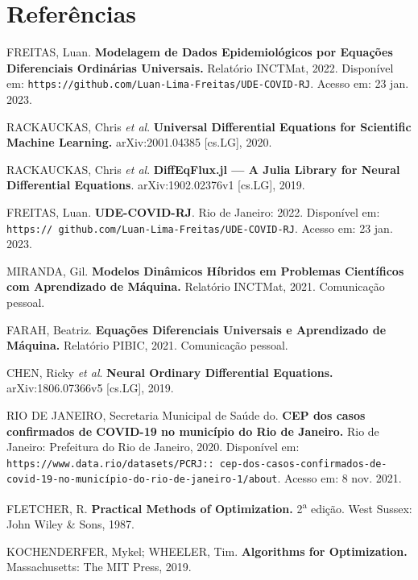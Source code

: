 \documentclass[a4paper,12pt]{article}
\begin{document}
\section{Referências}

\begin{enumerate}[label={[\arabic*]}]
	\item FREITAS, Luan. \textbf{Modelagem de Dados Epidemiológicos por Equações Diferenciais Ordinárias Universais.} Relatório INCTMat, 2022. Disponível em: \texttt{https://github.com/Luan-Lima-Freitas/UDE-COVID-RJ}. Acesso em: 23 jan. 2023.
	\item  RACKAUCKAS, Chris \textit{et al}. \textbf{Universal Differential Equations for Scientific Machine Learning.} arXiv:2001.04385 [cs.LG], 2020.
	\item RACKAUCKAS, Chris \textit{et al}. \textbf{DiffEqFlux.jl — A Julia Library for Neural Differential Equations}. arXiv:1902.02376v1 [cs.LG], 2019.
	\item FREITAS, Luan. \textbf{UDE-COVID-RJ}. Rio de Janeiro: 2022. Disponível em: \texttt{https://
	github.com/Luan-Lima-Freitas/UDE-COVID-RJ}. Acesso em: 23 jan. 2023.
	\item MIRANDA, Gil. \textbf{Modelos Dinâmicos Híbridos em Problemas Científicos com Aprendizado	de Máquina.} Relatório INCTMat, 2021. Comunicação pessoal.
	\item FARAH, Beatriz. \textbf{Equações Diferenciais Universais e Aprendizado de Máquina.} Relatório	PIBIC, 2021. Comunicação pessoal.
	\item  CHEN, Ricky \textit{et al}. \textbf{Neural Ordinary Differential Equations.} arXiv:1806.07366v5 [cs.LG], 2019.
	\item RIO DE JANEIRO, Secretaria Municipal de Saúde do. \textbf{CEP dos casos confirmados de COVID-19 no município do Rio de Janeiro.} Rio de Janeiro: Prefeitura do Rio de Janeiro, 2020. Disponível em: \texttt{https://www.data.rio/datasets/PCRJ::
	cep-dos-casos-confirmados-de-covid-19-no-município-do-rio-de-janeiro-1\newline /about}. Acesso em: 8 nov. 2021.
	\item FLETCHER, R. \textbf{Practical Methods of Optimization.} 2\textsuperscript{a} edição. West Sussex: John Wiley \& Sons, 1987.
	\item KOCHENDERFER, Mykel; WHEELER, Tim. \textbf{Algorithms for Optimization.} Massachusetts: The MIT Press, 2019.
\end{enumerate}
\end{document}
